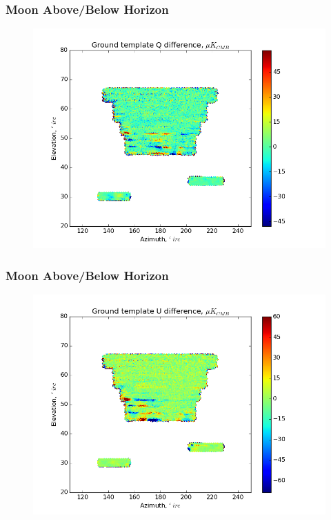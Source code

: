 \documentclass{beamer}
\begin{document}
\begin{frame}
\frametitle{Moon Above/Below Horizon}
\begin{figure}
\includegraphics[width=0.9\linewidth]{dQ_gt_MOON_HORIZON.png}
\end{figure}
\end{frame}

\begin{frame}
\frametitle{Moon Above/Below Horizon}
\begin{figure}
\includegraphics[width=0.9\linewidth]{dU_gt_MOON_HORIZON.png}
\end{figure}
\end{frame}
\end{document}
